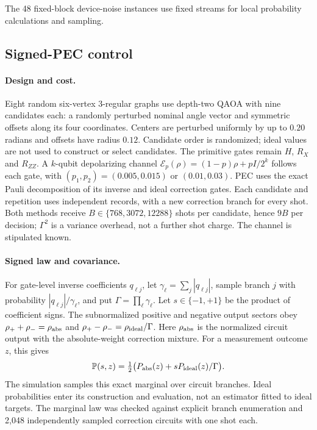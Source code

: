 \documentclass[a4paper,onecolumn,unpublished,nopdfoutputerror]{quantumarticle}
\theoremstyle{plain}
\theoremstyle{definition}
\newcommand{\Prob}{\mathbb{P}}
\newcommand{\1}{\mathbf{1}}
\begin{document}
The 48 fixed-block device-noise instances use fixed streams for local probability calculations and sampling.

\subsection{Signed-PEC control}
\label{app:signed_pec}

\paragraph{Design and cost.}
Eight random six-vertex 3-regular graphs use depth-two QAOA with nine candidates each: a randomly perturbed nominal angle vector and symmetric offsets along its four coordinates. Centers are perturbed uniformly by up to $0.20$ radians and offsets have radius $0.12$. Candidate order is randomized; ideal values are not used to construct or select candidates. The primitive gates remain $H$, $R_X$ and $R_{ZZ}$. A $k$-qubit depolarizing channel $\mathcal E_p(\rho)=(1-p)\rho+pI/2^k$ follows each gate, with $(p_1,p_2)=(0.005,0.015)$ or $(0.01,0.03)$. PEC uses the exact Pauli decomposition of its inverse and ideal correction gates. Each candidate and repetition uses independent records, with a new correction branch for every shot. Both methods receive $B\in\{768,3072,12288\}$ shots per candidate, hence $9B$ per decision; $\Gamma^2$ is a variance overhead, not a further shot charge. The channel is stipulated known.

\paragraph{Signed law and covariance.}
For gate-level inverse coefficients $q_{\ell j}$, let $\gamma_\ell=\sum_j|q_{\ell j}|$, sample branch $j$ with probability $|q_{\ell j}|/\gamma_\ell$, and put $\Gamma=\prod_\ell\gamma_\ell$. Let $s\in\{-1,+1\}$ be the product of coefficient signs. The subnormalized positive and negative output sectors obey $\rho_++\rho_-=\rho_{\rm abs}$ and $\rho_+-\rho_-=\rho_{\rm ideal}/\Gamma$. Here $\rho_{\rm abs}$ is the normalized circuit output with the absolute-weight correction mixture. For a measurement outcome $z$, this gives
\begin{equation}\label{eq:pec_signed_law}
\Prob(s,z)=\tfrac12\bigl(P_{\rm abs}(z)+sP_{\rm ideal}(z)/\Gamma\bigr).
\end{equation}
The simulation samples this exact marginal over circuit branches. Ideal probabilities enter its construction and evaluation, not an estimator fitted to ideal targets. The marginal law was checked against explicit branch enumeration and 2,048 independently sampled correction circuits with one shot each.
\end{document}
